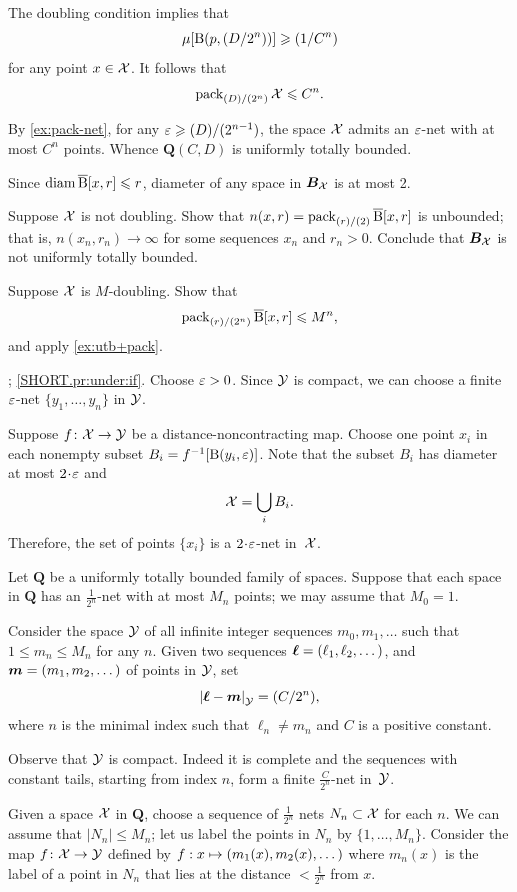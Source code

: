 The doubling condition implies that 
\[\mu[\mathrm{B}{}(p,(D/2^n))]\geqslant(1/C^n)\]
for any point $x\in \mathcal{X}$.
It follows that 
\[\operatorname{\rm pack}\nolimits_{(D)/(2^n)}\mathcal{X}\leqslant C^n.\]

By \ref{ex:pack-net}, for any $\varepsilon\geqslant(D)/(2^{n-1})$, the space $\mathcal{X}$ admits an $\varepsilon$-net with at most $C^n$ points.
Whence $\bm{Q}(C,D)$ is uniformly totally bounded.

Since $\operatorname{\rm diam}\nolimits \overline{\mathrm{B}}{}[x,r]\leqslant r$, diameter of any space in $\bm{B}_{\mathcal{X}}$ is at most 2.

Suppose $\mathcal{X}$ is not doubling.
Show that $n(x,r)=\operatorname{\rm pack}\nolimits_{(r)/(2)}\overline{\mathrm{B}}{}[x,r]$ is unbounded;
that is, $n(x_n,r_n)\to\infty$ for some sequences $x_n$ and $r_n>0$.
Conclude that $\bm{B}_{\mathcal{X}}$ is not uniformly totally bounded.

Suppose $\mathcal{X}$ is $M$-doubling.
Show that 
\[\operatorname{\rm pack}\nolimits_{(r)/(2^n)}\overline{\mathrm{B}}{}[x,r]\leqslant M^n,\]
and apply \ref{ex:utb+pack}.



\parbf{\ref{pr:under}}; \ref{SHORT.pr:under:if}.
Choose $\varepsilon>0$.
Since $\mathcal{Y}$ is compact, we can choose a finite $\varepsilon$-net $\{y_1,\dots,y_{n}\}$ in $\mathcal{Y}$.

Suppose $f\colon\mathcal{X}\to \mathcal{Y}$ be a distance-noncontracting map.
Choose one point $x_i$ in each nonempty subset $B_i=f^{-1}[\mathrm{B}{}(y_i,\varepsilon)]$.
Note that the subset $B_i$ has diameter at most $2\cdot \eps$ and 
\[\mathcal{X}=\bigcup_iB_i.\]
Therefore, the set of points $\{x_i\}$ is a $2\cdot\eps$-net in~$\mathcal{X}$.

Let $\bm{Q}$ be a uniformly totally bounded family of spaces. 
Suppose that each space in $\bm{Q}$ has an $\tfrac1{2^n}$-net with at most $M_n$ points; we may assume that $M_0=1$.

Consider the space $\mathcal{Y}$ of all infinite integer sequences $m_0,m_1,\dots$ such that $1\le m_n\le M_n$ for any $n$.
Given two sequences $\bm{\ell}\z=(\ell_1,\ell_2,\dots)$, and $\bm{m}\z=(m_1,m_2,\dots)$ of points in $\mathcal{Y}$, set 
\[\dist{\bm{\ell}}{\bm{m}}{\spc{Y}}=\tfrac C{2^{n}},\]
where $n$ is the minimal index such that $\ell_n\ne m_n$ and $C$ is a positive constant.

Observe that $\mathcal{Y}$ is compact.
Indeed it is complete and the sequences with constant tails, starting from index $n$, form a finite $\tfrac C{2^{n}}$-net in~$\mathcal{Y}$.

Given a space $\mathcal{X}$ in $\bm{Q}$,
choose a sequence of $\tfrac1{2^n}$ nets 
$N_n\subset\mathcal{X}$ for each $n$.
We can assume that $|N_n|\le M_n$; let us label the points in $N_n$ by $\{1,\dots,M_n\}$.
Consider the map $f\colon\mathcal{X}\to\mathcal{Y}$ defined by $f:x\z\mapsto (m_1(x),m_2(x),\dots)$ where $m_n(x)$ is the label of a point in $N_n$ that lies at the distance $<\tfrac1{2^n}$ from $x$.

